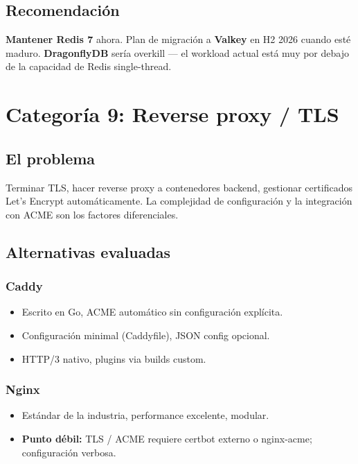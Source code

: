 \documentclass[11pt,a4paper]{article}
\begin{document}
\subsection{Recomendación}

\textbf{Mantener Redis 7} ahora. Plan de migración a \textbf{Valkey} en H2 2026 cuando esté maduro. \textbf{DragonflyDB} sería overkill — el workload actual está muy por debajo de la capacidad de Redis single-thread.

\newpage

\section{Categoría 9: Reverse proxy / TLS}

\subsection{El problema}

Terminar TLS, hacer reverse proxy a contenedores backend, gestionar certificados Let's Encrypt automáticamente. La complejidad de configuración y la integración con ACME son los factores diferenciales.

\subsection{Alternativas evaluadas}

\subsubsection{Caddy}
\begin{itemize}[leftmargin=*,itemsep=0pt]
\item Escrito en Go, ACME automático sin configuración explícita.
\item Configuración minimal (Caddyfile), JSON config opcional.
\item HTTP/3 nativo, plugins via builds custom.
\end{itemize}

\subsubsection{Nginx}
\begin{itemize}[leftmargin=*,itemsep=0pt]
\item Estándar de la industria, performance excelente, modular.
\item \textbf{Punto débil:} TLS / ACME requiere certbot externo o nginx-acme; configuración verbosa.
\end{itemize}
\end{document}
